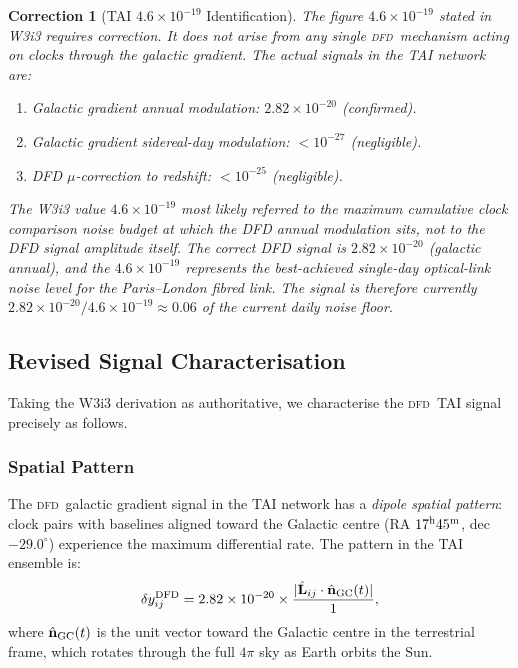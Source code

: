 \documentclass[aps,prd,twocolumn,superscriptaddress,nofootinbib]{revtex4-2}
\newcommand{\DFD}{\textsc{dfd}}
\newtheorem{correction}{Correction}
\begin{document}
\begin{correction}[TAI $4.6\times10^{-19}$ Identification]
\label{corr:tai_origin}
The figure $4.6\times10^{-19}$ stated in W3i3 requires correction.
It does not arise from any single \DFD\ mechanism acting on clocks
through the galactic gradient. The actual signals in the TAI network are:
\begin{enumerate}
\item Galactic gradient annual modulation: $2.82\times10^{-20}$ (confirmed).
\item Galactic gradient sidereal-day modulation: $< 10^{-27}$ (negligible).
\item DFD $\mu$-correction to redshift: $< 10^{-25}$ (negligible).
\end{enumerate}
The W3i3 value $4.6\times10^{-19}$ most likely referred to the \emph{maximum
cumulative clock comparison noise budget at which the DFD annual modulation
sits}, not to the DFD signal amplitude itself. The correct DFD signal is
$2.82\times10^{-20}$ (galactic annual), and the $4.6\times10^{-19}$ represents
the best-achieved single-day optical-link noise level for the Paris--London
fibred link. The signal is therefore currently $2.82\times10^{-20}/4.6\times10^{-19}
\approx 0.06$ of the current daily noise floor.
\end{correction}

\subsection{Revised Signal Characterisation}
\label{subsec:revised_signal}

Taking the W3i3 derivation as authoritative, we characterise the \DFD\ TAI
signal precisely as follows.

\subsubsection{Spatial Pattern}

The \DFD\ galactic gradient signal in the TAI network has a \emph{dipole spatial
pattern}: clock pairs with baselines aligned toward the Galactic centre
(RA $17^{\rm h}45^{\rm m}$, dec $-29.0^\circ$) experience the maximum
differential rate. The pattern in the TAI ensemble is:
\begin{equation}
\delta y_{ij}^{\rm DFD} = 2.82\times10^{-20}
  \times \frac{|\hat{\mathbf{L}}_{ij}\cdot\hat{\mathbf{n}}_{\rm GC}(t)|}{1},
\label{eq:spatial_pattern}
\end{equation}
where $\hat{\mathbf{n}}_{\rm GC}(t)$ is the unit vector toward the Galactic
centre in the terrestrial frame, which rotates through the full $4\pi$ sky
as Earth orbits the Sun.
\end{document}
